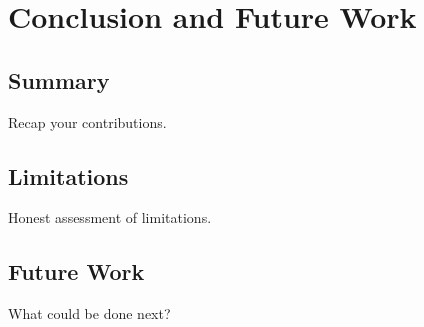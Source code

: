 \chapter{Conclusion and Future Work}
\label{ch:conclusion}

\section{Summary}

Recap your contributions.

\section{Limitations}

Honest assessment of limitations.

\section{Future Work}

What could be done next?
